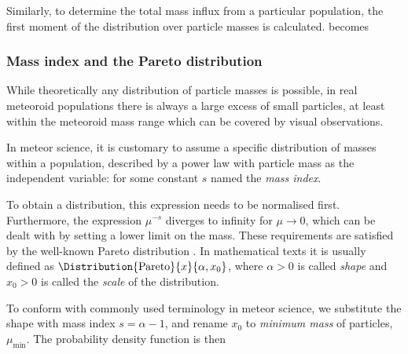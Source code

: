             Similarly, to determine the total mass influx from a particular population, the first moment
            of the distribution over particle masses is calculated.
             becomes

        \subsubsection{Mass index and the Pareto distribution} \label{msms}
            While theoretically any distribution of particle masses is possible,
            in real meteoroid populations there is always a large excess of small particles,
            at least within the meteoroid mass range which can be covered by visual observations.

            In meteor science, it is customary to assume a specific distribution of masses within a population,
            described by a power law with particle mass as the independent variable:
            for some constant $s$ named the \emph{mass index}.

            To obtain a distribution, this expression needs to be normalised first.
            Furthermore, the expression $\mu^{-s}$ diverges to infinity for $\mu \to 0$,
            which can be dealt with by setting a lower limit on the mass.
            These requirements are satisfied by the well-known Pareto distribution \citep{arnold1983}.
            In mathematical texts it is usually defined as $\Distribution{\mathrm{Pareto}}{x}{\alpha, x_0}$,
            where $\alpha > 0$ is called \emph{shape} and $x_0 > 0$ is called the \emph{scale} of the distribution.

            To conform with commonly used terminology in meteor science, we substitute the shape with mass index
            $s = \alpha - 1$, and rename $x_0$ to \emph{minimum mass} of particles, $\mu_\mathrm{min}$.
            The probability density function is then


